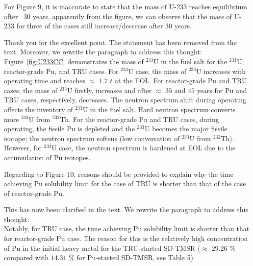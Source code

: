 \documentclass[answers,11pt]{exam}
\begin{document}
\begin{questions}
        \question For Figure 9, it is inaccurate to state that the mass of U-233 reaches equilibrium after ~30 years, apparently from the figure, we can observe that the mass of U-233 for three of the cases still increase/decrease after 30 years.
        
        \begin{solution}
                Thank you for the excellent point. The statement has been removed from the text.
                Moreover, we rewrite the paragraph to address this thought:\\
                
                Figure~\ref{fig:U233CC} demonstrates the mass of $^{233}$U in the fuel salt for the $^{233}$U, reactor-grade Pu, and TRU cases. For $^{233}$U case, the mass of $^{233}$U increases with operating time and reaches $\approx$ $1.7$ $t$ at the EOL. For reactor-grade Pu and TRU cases, the mass of $^{233}$U firstly, increases and after $\approx$ $35$ and $45$ years for Pu and TRU cases, respectively, decreases. The neutron spectrum shift during operating affects the inventory of $^{233}$U in the fuel salt. Hard neutron spectrum converts more $^{233}$U from $^{232}$Th. For the reactor-grade Pu and TRU cases, during operating, the fissile Pu is depleted and the $^{233}$U becomes the major fissile isotope; the neutron spectrum softens (low conversation of $^{233}$U from $^{232}$Th). However, for $^{233}$U case, the neutron spectrum is hardened at EOL due to the accumulation of Pu isotopes.                
                
        \end{solution}

        \question Regarding to Figure 10, reasons should be provided to explain why the time achieving Pu solubility limit for the case of TRU is shorter than that of the case of reactor-grade Pu.
        \begin{solution}
                 This has now been clarified in the text.
                 We rewrite the paragraph to address this thought:\\
                 
                 Notably, for TRU case, the time achieving Pu solubility limit is shorter than that for reactor-grade Pu case. The reason for this is the relatively high concentration of Pu in the initial heavy metal for the TRU-started SD-TMSR ($\approx$ $29.26$ \% compared with $14.31$ \% for Pu-started SD-TMSR, see Table 5).
                 

\end{solution}
\end{questions}
\end{document}

